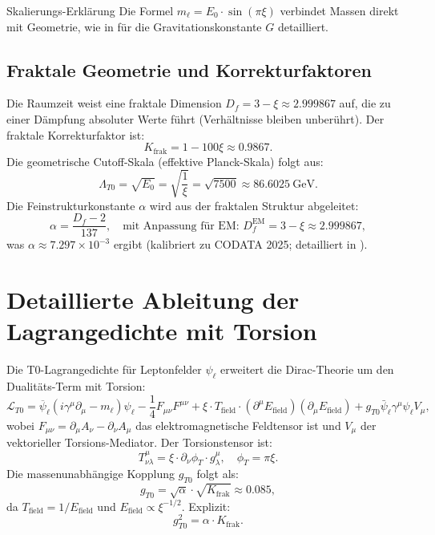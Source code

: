 \documentclass[12pt,a4paper]{article}
\begin{document}
	\begin{explanation}{Skalierungs-Erklärung}
		Die Formel $m_\ell = E_0 \cdot \sin(\pi \xi)$ verbindet Massen direkt mit Geometrie, wie in \cite{T0_Gravitationskonstante} für die Gravitationskonstante $G$ detailliert.
	\end{explanation}
	
	\subsection{Fraktale Geometrie und Korrekturfaktoren}
	Die Raumzeit weist eine fraktale Dimension $D_f = 3 - \xi \approx 2.999867$ auf, die zu einer Dämpfung absoluter Werte führt (Verhältnisse bleiben unberührt). Der fraktale Korrekturfaktor ist:
	\begin{equation}
		K_\text{frak} = 1 - 100 \xi \approx 0.9867.
	\end{equation}
	Die geometrische Cutoff-Skala (effektive Planck-Skala) folgt aus:
	\begin{equation}
		\Lambda_{T0} = \sqrt{E_0} = \sqrt{\frac{1}{\xi}} = \sqrt{7500} \approx \SI{86.6025}{\giga\electronvolt}.
	\end{equation}
	Die Feinstrukturkonstante $\alpha$ wird aus der fraktalen Struktur abgeleitet:
	\begin{equation}
		\alpha = \frac{D_f - 2}{137}, \quad \text{mit Anpassung für EM: } D_f^\text{EM} = 3 - \xi \approx 2.999867,
	\end{equation}
	was $\alpha \approx 7.297 \times 10^{-3}$ ergibt (kalibriert zu CODATA 2025; detailliert in \cite{T0_FineStructure}).
	
	\section{Detaillierte Ableitung der Lagrangedichte mit Torsion}
	Die T0-Lagrangedichte für Leptonfelder $\psi_\ell$ erweitert die Dirac-Theorie um den Dualitäts-Term mit Torsion:
	\begin{equation}
		\mathcal{L}_{T0} = \overline{\psi}_\ell (i \gamma^\mu \partial_\mu - m_\ell) \psi_\ell - \frac{1}{4} F_{\mu\nu} F^{\mu\nu} + \xi \cdot T_\text{field} \cdot (\partial^\mu E_\text{field}) (\partial_\mu E_\text{field}) + g_{T0} \bar{\psi}_\ell \gamma^\mu \psi_\ell V_\mu,
	\end{equation}
	wobei $F_{\mu\nu} = \partial_\mu A_\nu - \partial_\nu A_\mu$ das elektromagnetische Feldtensor ist und $V_\mu$ der vektorieller Torsions-Mediator. Der Torsionstensor ist:
	\begin{equation}
		T^\mu_{\nu\lambda} = \xi \cdot \partial_\nu \phi_T \cdot g_{\lambda}^\mu, \quad \phi_T = \pi \xi.
	\end{equation}
	Die massenunabhängige Kopplung $g_{T0}$ folgt als:
	\begin{equation}
		g_{T0} = \sqrt{\alpha} \cdot \sqrt{K_\text{frak}} \approx 0.085,
	\end{equation}
	da $T_\text{field} = 1 / E_\text{field}$ und $E_\text{field} \propto \xi^{-1/2}$. Explizit:
	\begin{equation}
		g_{T0}^2 = \alpha \cdot K_\text{frak}.
	\end{equation}
	
\end{document}
